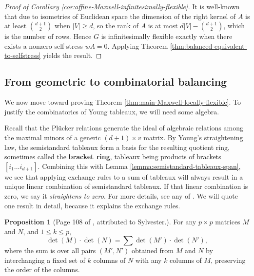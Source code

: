 \documentclass[11pt,letterpaper]{amsart}
\theoremstyle{definition}
\newtheorem{proposition}{Proposition}
\begin{document}
\begin{proof}[Proof of Corollary \ref{cor:affine-Maxwell-infinitesimally-flexible}]
    It is well-known that due to isometries of Euclidean space the dimension of the right kernel of $A$ is at least $\binom{d+1}{2}$ when $|V| \geq d$, so the rank of $A$ is at most $d|V| - \binom{d+1}{2}$, which is the number of rows. Hence $G$ is infinitesimally flexible exactly when there exists a nonzero self-stress $wA = 0$. Applying Theorem \ref{thm:balanced-equivalent-to-selfstress} yields the result.
\end{proof}


\subsection{From geometric to combinatorial balancing}

We now move toward proving Theorem \ref{thm:main-Maxwell-locally-flexible}. To justify the combinatorics of Young tableaux, we will need some algebra.

Recall that the Pl\"ucker relations generate the ideal of algebraic relations among the maximal minors of a generic $(d+1) \times v$ matrix. By Young's straightening law, the semistandard tableaux form a basis for the resulting quotient ring, sometimes called the \textbf{bracket ring}, tableaux being products of brackets $[i_1 \dots i_{d+1}]$. Combining this with Lemma \ref{lemma:semistandard-tableaux-span}, we see that applying exchange rules to a sum of tableaux will always result in a unique linear combination of semistandard tableaux. If that linear combination is zero, we say it \textit{straightens to zero}. %
For more details, see any of \cite{Fulton, miller-sturmfels-combinatorial-algebra, bernd-algorithms}. We will quote one result in detail, because it explains the exchange rules.

\begin{proposition}[Page 108 of \cite{Fulton}, attributed to Sylvester.]\label{proposition:Sylvester-exchange}
    For any $p \times p$ matrices $M$ and $N$, and $1\leq k \leq p$,
    \begin{equation*}
        \det(M) \cdot \det(N) = \sum \det(M') \cdot \det(N'),
    \end{equation*}
    where the sum is over all pairs $(M',N')$ obtained from $M$ and $N$ by interchanging a fixed set of $k$ columns of $N$ with any $k$ columns of $M$, preserving the order of the columns.
\end{proposition}
\end{document}
